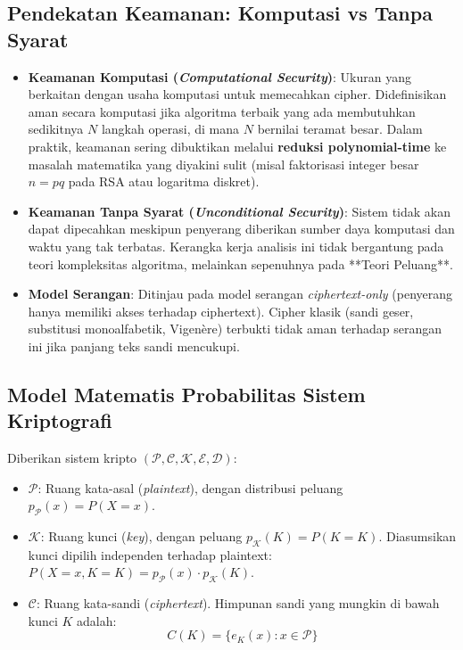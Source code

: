 \documentclass[11pt,a4paper]{article}
\begin{document}
\subsection{Pendekatan Keamanan: Komputasi vs Tanpa Syarat}
\begin{itemize}[leftmargin=*]
    \item \textbf{Keamanan Komputasi (\textit{Computational Security})}:
    Ukuran yang berkaitan dengan usaha komputasi untuk memecahkan cipher. Didefinisikan aman secara komputasi jika algoritma terbaik yang ada membutuhkan sedikitnya $N$ langkah operasi, di mana $N$ bernilai teramat besar. Dalam praktik, keamanan sering dibuktikan melalui \textbf{reduksi polynomial-time} ke masalah matematika yang diyakini sulit (misal faktorisasi integer besar $n = pq$ pada RSA atau logaritma diskret).
    \item \textbf{Keamanan Tanpa Syarat (\textit{Unconditional Security})}:
    Sistem tidak akan dapat dipecahkan meskipun penyerang diberikan sumber daya komputasi dan waktu yang tak terbatas. Kerangka kerja analisis ini tidak bergantung pada teori kompleksitas algoritma, melainkan sepenuhnya pada **Teori Peluang**.
    \item \textbf{Model Serangan}: Ditinjau pada model serangan \textit{ciphertext-only} (penyerang hanya memiliki akses terhadap ciphertext). Cipher klasik (sandi geser, substitusi monoalfabetik, Vigen\`ere) terbukti tidak aman terhadap serangan ini jika panjang teks sandi mencukupi.
\end{itemize}

\subsection{Model Matematis Probabilitas Sistem Kriptografi}
Diberikan sistem kripto $(\mathcal{P}, \mathcal{C}, \mathcal{K}, \mathcal{E}, \mathcal{D})$:
\begin{itemize}
    \item $\mathcal{P}$: Ruang kata-asal (\textit{plaintext}), dengan distribusi peluang $p_{\mathcal{P}}(x) = P(X = x)$.
    \item $\mathcal{K}$: Ruang kunci (\textit{key}), dengan peluang $p_{\mathcal{K}}(K) = P(K = K)$. Diasumsikan kunci dipilih independen terhadap plaintext: $P(X = x, K = K) = p_{\mathcal{P}}(x) \cdot p_{\mathcal{K}}(K)$.
    \item $\mathcal{C}$: Ruang kata-sandi (\textit{ciphertext}). Himpunan sandi yang mungkin di bawah kunci $K$ adalah:
    \begin{equation}
    \label{eq:CK}
    C(K) = \{e_K(x) : x \in \mathcal{P}\}
    \end{equation}
\end{itemize}
\end{document}
